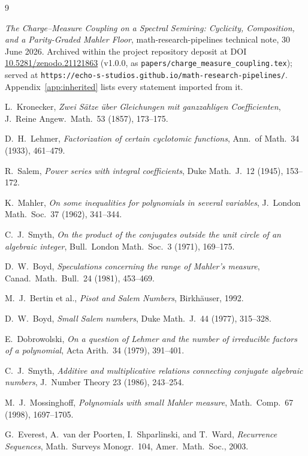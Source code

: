 \documentclass[11pt]{article}
\theoremstyle{plain}
\theoremstyle{definition}
\theoremstyle{remark}
\begin{document}
\begin{thebibliography}{9}

 \emph{The Charge--Measure Coupling on a Spectral Semiring:
Cyclicity, Composition, and a Parity-Graded Mahler Floor},
math-research-pipelines technical note, 30 June 2026. Archived within the project repository deposit at DOI
\url{10.5281/zenodo.21121863} (v1.0.0, as
\texttt{papers/charge\_measure\_coupling.tex}); served at
\texttt{https://echo-s-studios.github.io/math-research-pipelines/}.
Appendix~\ref{app:inherited} lists every statement imported from it.

 L.~Kronecker, \emph{Zwei S\"atze \"uber Gleichungen mit
ganzzahligen Coefficienten}, J.~Reine Angew.~Math.\ 53 (1857), 173--175.

 D.~H.~Lehmer, \emph{Factorization of certain cyclotomic
functions}, Ann.\ of Math.\ 34 (1933), 461--479.

 R.~Salem, \emph{Power series with integral coefficients},
Duke Math.~J.\ 12 (1945), 153--172.

 K.~Mahler, \emph{On some inequalities for polynomials in
several variables}, J.~London Math.~Soc.\ 37 (1962), 341--344.

 C.~J.~Smyth, \emph{On the product of the conjugates outside the
unit circle of an algebraic integer}, Bull.~London Math.~Soc.\ 3 (1971),
169--175.

 D.~W.~Boyd, \emph{Speculations concerning the range of Mahler's
measure}, Canad.~Math.~Bull.\ 24 (1981), 453--469.

 M.~J.~Bertin et al., \emph{Pisot and Salem Numbers},
Birkh\"auser, 1992.

 D.~W.~Boyd, \emph{Small Salem numbers}, Duke Math.~J.\
44 (1977), 315--328.

 E.~Dobrowolski, \emph{On a question of Lehmer and the
number of irreducible factors of a polynomial}, Acta Arith.\ 34 (1979),
391--401.

 C.~J.~Smyth, \emph{Additive and multiplicative
relations connecting conjugate algebraic numbers}, J.~Number Theory 23
(1986), 243--254.

 M.~J.~Mossinghoff, \emph{Polynomials with small
Mahler measure}, Math.~Comp.\ 67 (1998), 1697--1705.

 G.~Everest, A.~van der Poorten, I.~Shparlinski, and
T.~Ward, \emph{Recurrence Sequences}, Math.\ Surveys Monogr.\ 104,
Amer.\ Math.\ Soc., 2003.


\end{thebibliography}
\end{document}
